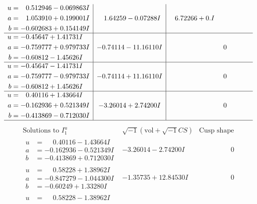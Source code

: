 \documentclass[1p]{elsarticle_modified}
\theoremstyle{definition}
\newcommand{\I}{\sqrt{-1}}
\begin{document}
$$\begin{array}{c|c|c}
\begin{aligned}
u &= \phantom{-}0.512946 - 0.069863 I \\
a &= \phantom{-}1.053910 + 0.199001 I \\
b &= -0.602683 + 0.154149 I\end{aligned}
 & \phantom{-}1.64259 - 0.07288 I & \phantom{-}6.72266 + 0. I\phantom{ +0.000000I} \\ \hline\begin{aligned}
u &= -0.45647 + 1.41731 I \\
a &= -0.759777 + 0.979733 I \\
b &= -0.60812 - 1.45626 I\end{aligned}
 & -0.74114 - 11.16110 I & \phantom{-0.000000 } 0 \\ \hline\begin{aligned}
u &= -0.45647 - 1.41731 I \\
a &= -0.759777 - 0.979733 I \\
b &= -0.60812 + 1.45626 I\end{aligned}
 & -0.74114 + 11.16110 I & \phantom{-0.000000 } 0 \\ \hline\begin{aligned}
u &= \phantom{-}0.40116 + 1.43664 I \\
a &= -0.162936 + 0.521349 I \\
b &= -0.413869 - 0.712030 I\end{aligned}
 & -3.26014 + 2.74200 I & \phantom{-0.000000 } 0\\
 \hline 
 \end{array}$$\newpage$$\begin{array}{c|c|c}  
\text{Solutions to }I^u_{1}& \I (\text{vol} + \sqrt{-1}CS) & \text{Cusp shape}\\
 \hline 
\begin{aligned}
u &= \phantom{-}0.40116 - 1.43664 I \\
a &= -0.162936 - 0.521349 I \\
b &= -0.413869 + 0.712030 I\end{aligned}
 & -3.26014 - 2.74200 I & \phantom{-0.000000 } 0 \\ \hline\begin{aligned}
u &= \phantom{-}0.58228 + 1.38962 I \\
a &= -0.847279 - 1.044300 I \\
b &= -0.60249 + 1.33280 I\end{aligned}
 & -1.35735 + 12.84530 I & \phantom{-0.000000 } 0 \\ \hline\begin{aligned}
u &= \phantom{-}0.58228 - 1.38962 I \\

\end{aligned}
\end{array}$$
\end{document}
